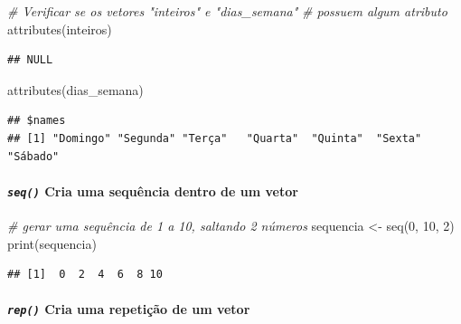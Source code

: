 \documentclass[
]{article}
\newenvironment{Shaded}{\begin{snugshade}}{\end{snugshade}}
\newcommand{\CommentTok}[1]{\textcolor[rgb]{0.56,0.35,0.01}{\textit{#1}}}
\newcommand{\DecValTok}[1]{\textcolor[rgb]{0.00,0.00,0.81}{#1}}
\newcommand{\FunctionTok}[1]{\textcolor[rgb]{0.00,0.00,0.00}{#1}}
\newcommand{\NormalTok}[1]{#1}
\newcommand{\OtherTok}[1]{\textcolor[rgb]{0.56,0.35,0.01}{#1}}
\begin{document}
\begin{Shaded}
\begin{Highlighting}[]
\CommentTok{\# Verificar se os vetores "inteiros" e "dias\_semana"}
\CommentTok{\# possuem algum atributo}
\FunctionTok{attributes}\NormalTok{(inteiros)}
\end{Highlighting}
\end{Shaded}

\begin{verbatim}
## NULL
\end{verbatim}

\begin{Shaded}
\begin{Highlighting}[]
\FunctionTok{attributes}\NormalTok{(dias\_semana)}
\end{Highlighting}
\end{Shaded}

\begin{verbatim}
## $names
## [1] "Domingo" "Segunda" "Terça"   "Quarta"  "Quinta"  "Sexta"   "Sábado"
\end{verbatim}

\hypertarget{seq-cria-uma-sequuxeancia-dentro-de-um-vetor}{%
\paragraph{\texorpdfstring{\emph{\texttt{seq()}} Cria uma sequência
dentro de um
vetor}{seq() Cria uma sequência dentro de um vetor}}\label{seq-cria-uma-sequuxeancia-dentro-de-um-vetor}}

\begin{Shaded}
\begin{Highlighting}[]
\CommentTok{\# gerar uma sequência de 1 a 10, saltando 2 números}
\NormalTok{sequencia }\OtherTok{\textless{}{-}} \FunctionTok{seq}\NormalTok{(}\DecValTok{0}\NormalTok{, }\DecValTok{10}\NormalTok{, }\DecValTok{2}\NormalTok{)}
\FunctionTok{print}\NormalTok{(sequencia)}
\end{Highlighting}
\end{Shaded}

\begin{verbatim}
## [1]  0  2  4  6  8 10
\end{verbatim}

\hypertarget{rep-cria-uma-repetiuxe7uxe3o-de-um-vetor}{%
\paragraph{\texorpdfstring{\emph{\texttt{rep()}} Cria uma repetição de
um
vetor}{rep() Cria uma repetição de um vetor}}\label{rep-cria-uma-repetiuxe7uxe3o-de-um-vetor}}
\end{document}
